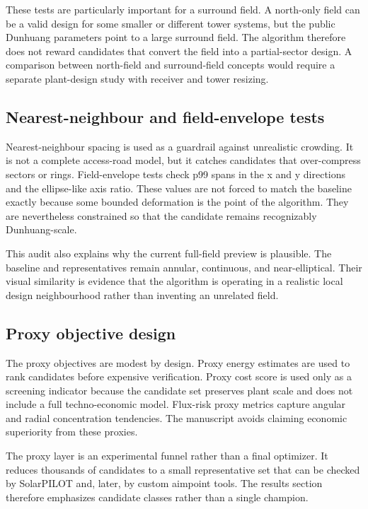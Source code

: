 \documentclass[final,3p,times]{elsarticle}
\begin{document}
These tests are particularly important for a surround field. A north-only field can be a valid design for some smaller or different tower systems, but the public Dunhuang parameters point to a large surround field. The algorithm therefore does not reward candidates that convert the field into a partial-sector design. A comparison between north-field and surround-field concepts would require a separate plant-design study with receiver and tower resizing.

\subsection{Nearest-neighbour and field-envelope tests}
Nearest-neighbour spacing is used as a guardrail against unrealistic crowding. It is not a complete access-road model, but it catches candidates that over-compress sectors or rings. Field-envelope tests check p99 spans in the x and y directions and the ellipse-like axis ratio. These values are not forced to match the baseline exactly because some bounded deformation is the point of the algorithm. They are nevertheless constrained so that the candidate remains recognizably Dunhuang-scale.

This audit also explains why the current full-field preview is plausible. The baseline and representatives remain annular, continuous, and near-elliptical. Their visual similarity is evidence that the algorithm is operating in a realistic local design neighbourhood rather than inventing an unrelated field.

\subsection{Proxy objective design}
The proxy objectives are modest by design. Proxy energy estimates are used to rank candidates before expensive verification. Proxy cost score is used only as a screening indicator because the candidate set preserves plant scale and does not include a full techno-economic model. Flux-risk proxy metrics capture angular and radial concentration tendencies. The manuscript avoids claiming economic superiority from these proxies.

The proxy layer is an experimental funnel rather than a final optimizer. It reduces thousands of candidates to a small representative set that can be checked by SolarPILOT and, later, by custom aimpoint tools. The results section therefore emphasizes candidate classes rather than a single champion.
\end{document}
